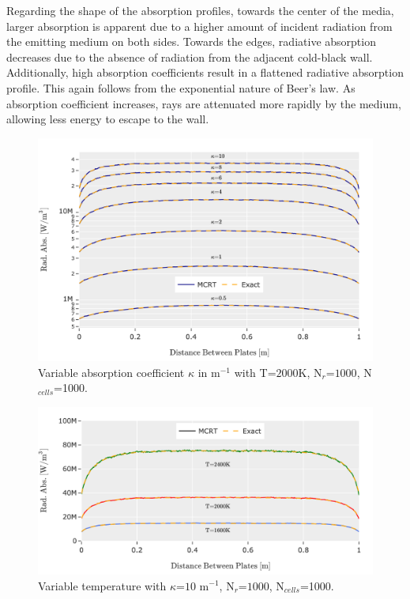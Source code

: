 Regarding the shape of the absorption profiles, towards the center of the media, larger absorption is apparent due to a higher amount of incident radiation from the emitting medium on both sides.
Towards the edges, radiative absorption decreases due to the absence of radiation from the adjacent cold-black wall. Additionally, high absorption coefficients result in a flattened radiative absorption profile. This again follows from the exponential nature of Beer's law. As absorption coefficient increases, rays are attenuated more rapidly by the medium, allowing less energy to escape to the wall.
\begin{figure}[!ht]
\centering
\includegraphics[width=0.95\linewidth]{figures/ch4/PPcomparison1.png}
\caption{Variable absorption coefficient $\kappa{}$ in m$^{-1}$ with T=$2000$K, N$_r$=$1000$, N$_{cells}$=1000.}
\label{fig:PPcomp_kappa}
\end{figure}
\begin{figure}[!ht]
\centering
\includegraphics[width=0.95\linewidth]{figures/ch4/PPcomparison2.png}
\caption{Variable temperature with $\kappa{}$=$10$ m$^{-1}$, N$_r$=$1000$, N$_{cells}$=1000.}
\label{fig:PPcomp_temp}
\end{figure}


